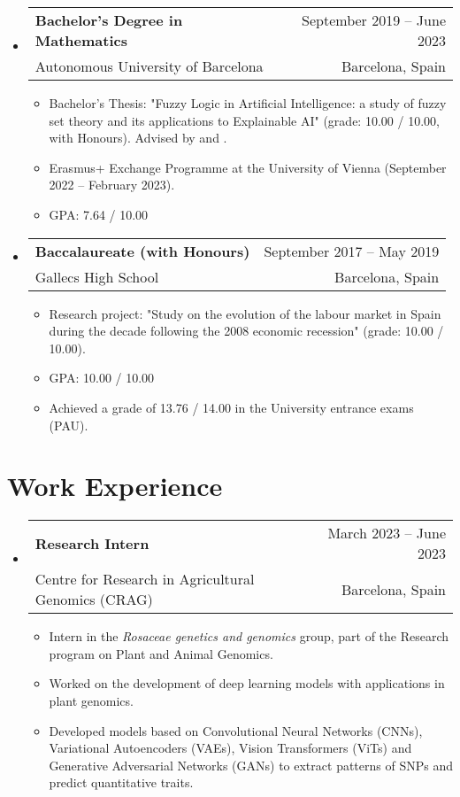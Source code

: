 \documentclass[a4paper,10pt]{article}
\makeatletter
\newcommand{\resumeQuadHeading}[4]{
  \item
  \begin{tabular*}{0.96\textwidth}[t]{l@{\extracolsep{\fill}}r}
    \textbf{#1} & \small #2 \\
    \small#3 & \small #4 \\
  \end{tabular*}
}
\newcommand{\resumeHeadingListStart}{
  \begin{itemize}[leftmargin=0.15in, label={}]
}
\newcommand{\resumeHeadingListEnd}{\end{itemize}}
\makeatother
\begin{document}
    \resumeHeadingListStart{}
      \resumeQuadHeading{Bachelor's Degree in Mathematics}{September 2019 – June 2023}
      {Autonomous University of Barcelona}{Barcelona, Spain}
      \begin{itemize}[leftmargin=3em, itemsep=0.1em, topsep=2pt]
          \item \small Bachelor's Thesis: "Fuzzy Logic in Artificial Intelligence: a study of fuzzy set theory and its applications to Explainable AI" (grade: 10.00 / 10.00, with Honours). Advised by  \href{https://www.iiia.csic.es/es/people/person/?person_id=35}{} and \href{https://mat.uab.cat/~pitsch/}{}.
          \item \small Erasmus+ Exchange Programme at the University of Vienna (September 2022 – February 2023).
          \item \small GPA: 7.64 / 10.00
      \end{itemize}
    \resumeHeadingListEnd{}
  
  \resumeHeadingListStart{}
    \resumeQuadHeading{Baccalaureate (with Honours)}{September 2017 – May 2019}
    {Gallecs High School}{Barcelona, Spain}
    \begin{itemize}[leftmargin=3em, itemsep=0.1em, topsep=2pt]
      \item \small Research project: "Study on the evolution of the labour market in Spain during the decade following the 2008 economic recession" (grade: 10.00 / 10.00).
      \item \small GPA: 10.00 / 10.00
      \item \small Achieved a grade of 13.76 / 14.00 in the University entrance exams (PAU).
    \end{itemize}
  \resumeHeadingListEnd{}


\section{Work Experience}
  \resumeHeadingListStart{}
    \resumeQuadHeading{Research Intern}{March 2023 – June 2023}
    {Centre for Research in Agricultural Genomics (CRAG)}{Barcelona, Spain}
    \begin{itemize}[leftmargin=3em, itemsep=0.1em, topsep=2pt]
      \item \small Intern in the \textit{Rosaceae genetics and genomics} group, part of the Research program on Plant and Animal Genomics.
      \item \small Worked on the development of deep learning models with applications in plant genomics. 
      \item \small Developed models based on Convolutional Neural Networks (CNNs), Variational Autoencoders (VAEs), Vision Transformers (ViTs) and Generative Adversarial Networks (GANs) to extract patterns of SNPs and predict quantitative traits.
    \end{itemize}
  \resumeHeadingListEnd{}
\end{document}
